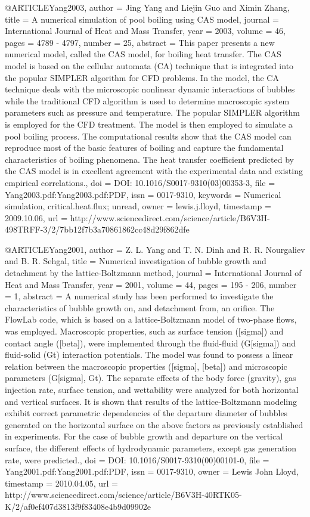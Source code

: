 {{@ARTICLE{Yang2003,
  author = {Jing Yang and Liejin Guo and Ximin Zhang},
  title = {A numerical simulation of pool boiling using CAS model},
  journal = {International Journal of Heat and Mass Transfer},
  year = {2003},
  volume = {46},
  pages = {4789 - 4797},
  number = {25},
  abstract = {This paper presents a new numerical model, called the CAS model, for
	boiling heat transfer. The CAS model is based on the cellular automata
	(CA) technique that is integrated into the popular SIMPLER algorithm
	for CFD problems. In the model, the CA technique deals with the microscopic
	nonlinear dynamic interactions of bubbles while the traditional CFD
	algorithm is used to determine macroscopic system parameters such
	as pressure and temperature. The popular SIMPLER algorithm is employed
	for the CFD treatment. The model is then employed to simulate a pool
	boiling process. The computational results show that the CAS model
	can reproduce most of the basic features of boiling and capture the
	fundamental characteristics of boiling phenomena. The heat transfer
	coefficient predicted by the CAS model is in excellent agreement
	with the experimental data and existing empirical correlations.},
  doi = {DOI: 10.1016/S0017-9310(03)00353-3},
  file = {Yang2003.pdf:Yang2003.pdf:PDF},
  issn = {0017-9310},
  keywords = {Numerical simulation, critical.heat.flux; unread},
  owner = {lewis.j.lloyd},
  timestamp = {2009.10.06},
  url = {http://www.sciencedirect.com/science/article/B6V3H-498TRFF-3/2/7bb12f7b3a70861862cc48d29f862dfe}
}

@ARTICLE{Yang2001,
  author = {Z. L. Yang and T. N. Dinh and R. R. Nourgaliev and B. R. Sehgal},
  title = {Numerical investigation of bubble growth and detachment by the lattice-Boltzmann
	method},
  journal = {International Journal of Heat and Mass Transfer},
  year = {2001},
  volume = {44},
  pages = {195 - 206},
  number = {1},
  abstract = {A numerical study has been performed to investigate the characteristics
	of bubble growth on, and detachment from, an orifice. The FlowLab
	code, which is based on a lattice-Boltzmann model of two-phase flows,
	was employed. Macroscopic properties, such as surface tension ([sigma])
	and contact angle ([beta]), were implemented through the fluid-fluid
	(G[sigma]) and fluid-solid (Gt) interaction potentials. The model
	was found to possess a linear relation between the macroscopic properties
	([sigma], [beta]) and microscopic parameters (G[sigma], Gt). The
	separate effects of the body force (gravity), gas injection rate,
	surface tension, and wettability were analyzed for both horizontal
	and vertical surfaces. It is shown that results of the lattice-Boltzmann
	modeling exhibit correct parametric dependencies of the departure
	diameter of bubbles generated on the horizontal surface on the above
	factors as previously established in experiments. For the case of
	bubble growth and departure on the vertical surface, the different
	effects of hydrodynamic parameters, except gas generation rate, were
	predicted.},
  doi = {DOI: 10.1016/S0017-9310(00)00101-0},
  file = {Yang2001.pdf:Yang2001.pdf:PDF},
  issn = {0017-9310},
  owner = {Lewis John Lloyd},
  timestamp = {2010.04.05},
  url = {http://www.sciencedirect.com/science/article/B6V3H-40RTK05-K/2/af0ef407d3813f9f83408e4b9d09902e}
}

}}
